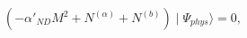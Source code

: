 \begin{equation}
(-\alpha'_{ND}M^{2}+N^{(\alpha)}+N^{(b)})\mid\Psi_{phys}\rangle=0,
\end{equation}

